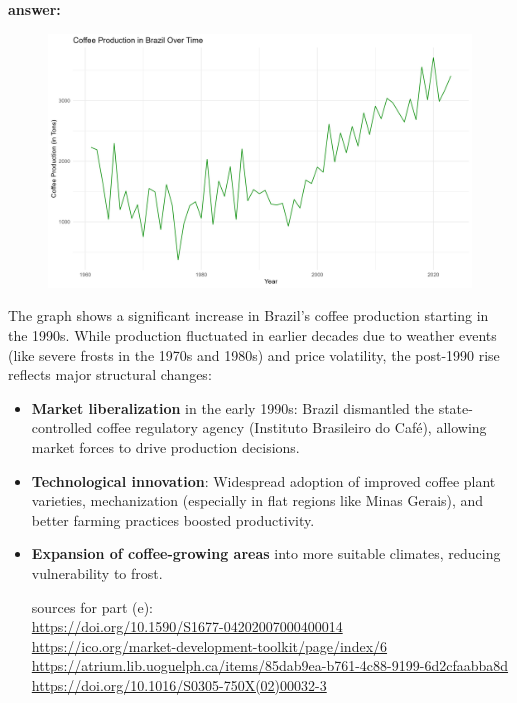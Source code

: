 \documentclass[12pt]{article}
\begin{document}
\textbf{answer:}\\

\begin{figure}[h]
    \centering
    \includegraphics[width=1\linewidth]{Figures/HW_2.2_e.png}
\end{figure} 

The graph shows a significant increase in Brazil’s coffee production starting in the 1990s. While production fluctuated in earlier decades due to weather events (like severe frosts in the 1970s and 1980s) and price volatility, the post-1990 rise reflects major structural changes:

\begin{itemize}
    \item \textbf{Market liberalization} in the early 1990s: Brazil dismantled the state-controlled coffee regulatory agency (Instituto Brasileiro do Café), allowing market forces to drive production decisions.
    \item \textbf{Technological innovation}: Widespread adoption of improved coffee plant varieties, mechanization (especially in flat regions like Minas Gerais), and better farming practices boosted productivity.
    \item \textbf{Expansion of coffee-growing areas} into more suitable climates, reducing vulnerability to frost.

sources for part (e):\\
\url{https://doi.org/10.1590/S1677-04202007000400014}\\
\url{https://ico.org/market-development-toolkit/page/index/6}\\
\url{https://atrium.lib.uoguelph.ca/items/85dab9ea-b761-4c88-9199-6d2cfaabba8d}\\
\url{https://doi.org/10.1016/S0305-750X(02)00032-3}\\

\end{itemize}
\end{document}
